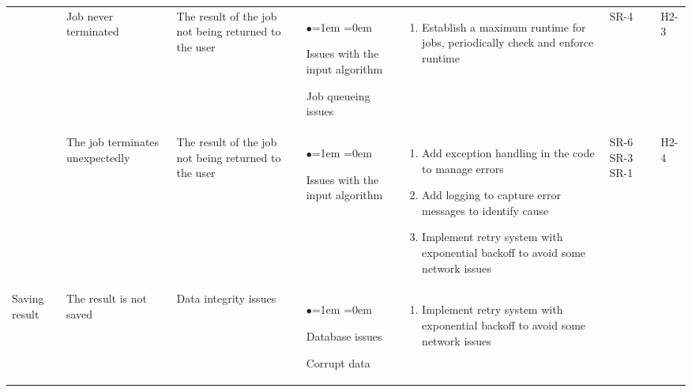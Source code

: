 \documentclass{article}
\begin{document}
\begin{table}[H]
    \centering
    \begin{tabularx}{\textwidth}{|P{2cm}|P{2cm}|P{2cm}|P{2cm}|P{3.45cm}|P{1cm}|P{1cm}|}
        & Job never terminated & The result of the job not being returned to the user & 
        \begin{list}{$\bullet$}{\leftmargin=1em \itemindent=0em}
            \item Issues with the input algorithm
            \item Job queueing issues
        \end{list}
        & 
        \begin{enumerate}[label=(\alph*)]{\leftmargin=1em \itemindent=0em}
            \item Establish a maximum runtime for jobs, periodically check and enforce runtime
        \end{enumerate}
        & SR-4 & H2-3\\
        & The job terminates unexpectedly & The result of the job not being returned to the user & 
        \begin{list}{$\bullet$}{\leftmargin=1em \itemindent=0em}
            \item Issues with the input algorithm
        \end{list}
        & 
        \begin{enumerate}[label=(\alph*)]{\leftmargin=1em \itemindent=0em}
            \item Add exception handling in the code to manage errors
            \item Add logging to capture error messages to identify cause
            \item Implement retry system with exponential backoff to avoid some network issues
        \end{enumerate}
        & SR-6 SR-3 SR-1 & H2-4\\
        \hline
        Saving result & The result is not saved & Data integrity issues & 
        \begin{list}{$\bullet$}{\leftmargin=1em \itemindent=0em}
            \item Database issues
            \item Corrupt data
        \end{list}
        & 
        \begin{enumerate}[label=(\alph*)]{\leftmargin=1em \itemindent=0em}
            \item Implement retry system with exponential backoff to avoid some network issues

\end{enumerate}
\end{tabularx}
\end{table}
\end{document}
